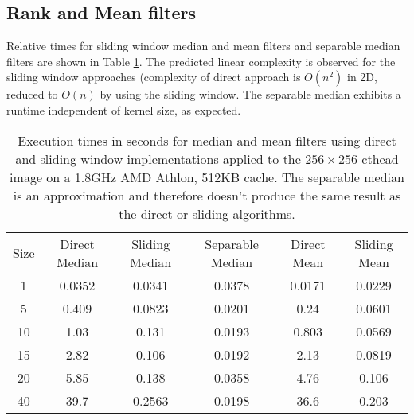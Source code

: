 \documentclass{InsightArticle}
\begin{document}
\subsection{Rank and Mean filters}
Relative times for sliding window median and mean filters and
separable median filters are shown in Table \ref{tab:perfRank}. The
predicted linear complexity is observed for the sliding window
approaches (complexity of direct approach is $O(n^2)$ in 2D, reduced
to $O(n)$ by using the sliding window. The separable median exhibits a
runtime independent of kernel size, as expected.
\begin{table}[htbp]
\centering
\begin{tabular}{cccccc}
\hline
Size  &  Direct Median &  Sliding Median & Separable Median & Direct Mean & Sliding Mean\\
1     &   0.0352 & 0.0341 & 0.0378 & 0.0171 & 0.0229\\
5     &   0.409  & 0.0823  & 0.0201 & 0.24  &  0.0601 \\
10    &   1.03   & 0.131 & 0.0193 & 0.803 &  0.0569 \\
15    &   2.82   & 0.106  & 0.0192 & 2.13  &  0.0819 \\
20    &   5.85   & 0.138  & 0.0358 & 4.76  &  0.106 \\
40    &   39.7   & 0.2563  & 0.0198 & 36.6  &  0.203 \\
\hline
\hline
\end{tabular}
\caption{Execution times in seconds for median and mean filters using direct and sliding window implementations applied to the $256 \times 256$ cthead image on a 1.8GHz AMD Athlon, 512KB cache. The separable median is an approximation and therefore doesn't produce the same result as the direct or sliding algorithms.\label{tab:perfRank}}
\end{table}
\end{document}
